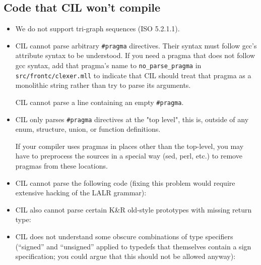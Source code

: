 \documentclass{article}
\def\t#1{{\tt #1}}
\begin{document}
\subsection{Code that CIL won't compile}
\begin{itemize}
\item We do not support tri-graph sequences (ISO 5.2.1.1).

\item CIL cannot parse arbitrary \t{\#pragma} directives.  Their
  syntax must follow gcc's attribute syntax to be understood.  If you
  need a pragma that does not follow gcc syntax, add that pragma's name
  to \t{no\_parse\_pragma} in \t{src/frontc/clexer.mll} to indicate that
  CIL should treat that pragma as a monolithic string rather than try
  to parse its arguments.

  CIL cannot parse a line containing an empty \t{\#pragma}.

\item CIL only parses \t{\#pragma} directives at the "top level", this is,
  outside of any enum, structure, union, or function definitions.

  If your compiler uses pragmas in places other than the top-level,
  you may have to preprocess the sources in a special way (sed, perl,
  etc.) to remove pragmas from these locations.

\item CIL cannot parse the following code (fixing this problem would require
  extensive hacking of the LALR grammar):

\item CIL also cannot parse certain K\&R old-style prototypes with missing
  return type:

\item CIL does not understand some obscure combinations of type
  specifiers (``signed'' and ``unsigned'' applied to typedefs that
  themselves contain a sign specification; you could argue that this
  should not be allowed anyway):


\end{itemize}
\end{document}
